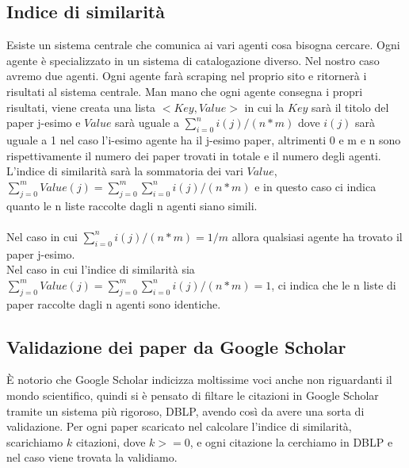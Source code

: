 \documentclass[12pt]{article}
\begin{document}
\subsection{Indice di similarit\`a}
Esiste un sistema centrale che comunica ai vari agenti cosa bisogna cercare. Ogni agente \`e specializzato in un sistema di catalogazione diverso. Nel nostro caso avremo due agenti. Ogni agente far\`a scraping nel proprio sito e ritorner\`a i risultati al sistema centrale. Man mano che ogni agente consegna i propri risultati, viene creata una lista $<Key, Value>$ in cui la $Key$ sar\`a il titolo del paper j-esimo e $Value$ sar\`a uguale a $\displaystyle\sum\limits_{i=0}^n i(j)/(n*m)$ dove $i(j)$ sar\`a uguale a 1 nel caso l'i-esimo agente ha il j-esimo paper, altrimenti 0 e m e n sono rispettivamente il numero dei paper trovati in totale e il numero degli agenti.\\
L'indice di similarit\`a sar\`a la sommatoria dei vari $Value$, $\displaystyle\sum\limits_{j=0}^m Value(j) = \displaystyle\sum\limits_{j=0}^m \displaystyle\sum\limits_{i=0}^n i(j)/(n*m)$ e in questo caso ci indica quanto le n liste raccolte dagli n agenti siano simili. \\\\
Nel caso in cui $\displaystyle\sum\limits_{i=0}^n i(j)/(n*m) = 1/m$ allora qualsiasi agente ha trovato il paper j-esimo.\\
Nel caso in cui l'indice di similarit\`a sia $\displaystyle\sum\limits_{j=0}^m Value(j) = \displaystyle\sum\limits_{j=0}^m \displaystyle\sum\limits_{i=0}^n i(j)/(n*m) = 1$, ci indica che le n liste di paper raccolte dagli n agenti sono identiche.\\

\subsection{Validazione dei paper da Google Scholar}
\`E notorio che Google Scholar indicizza moltissime voci anche non riguardanti il mondo scientifico, quindi si \`e pensato di filtare le citazioni in Google Scholar tramite un sistema pi\`u rigoroso, DBLP, avendo cos\`i da avere una sorta di validazione.
Per ogni paper scaricato nel calcolare l'indice di similarit\`a, scarichiamo $k$ citazioni, dove $k >= 0$, e ogni citazione la cerchiamo in DBLP e nel caso viene trovata la validiamo.
\end{document}
